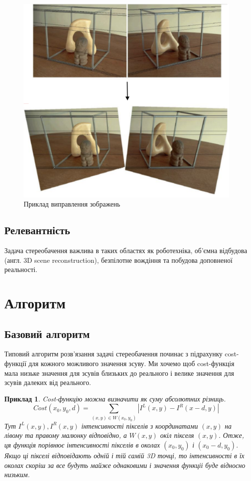 \documentclass[11pt]{article}
\newtheorem*{example*}{Приклад}
\theoremstyle{definition}
\begin{document}
\begin{figure}[h]
	\includegraphics[width=0.7\linewidth]{rectification_example}
	\centering
	\caption{Приклад виправлення зображень}
	\label{fig:rectification_example}
\end{figure}

\subsection{Релевантність}
Задача стереобачення важлива в таких областях як роботехніка, об'ємна відбудова (англ. 3D scene reconstruction), безпілотне вождіння та побудова доповненої реальності.

\section{Алгоритм}
\subsection{Базовий алгоритм}
Типовий алгоритм розв'язання задачі стереобачення починає з підрахунку cost-функції для кожного можливого значення зсуву. Ми хочемо щоб cost-функція мала низьке значення для зсувів близьких до реального і велике значення для зсувів далеких від реального. 
\begin{example*}
	Cost-функцію можна визначити як суму абсолютних різниць.
	\[ Cost(x_0, y_0, d) = \sum_{(x, y) \in W(x_0,y_0)} \left| I^L(x, y) - I^R(x - d, y) \right| \]
	Тут $I^L(x,y), I^R(x,y)$ інтенсивності пікселів з координатами $(x,y)$ на лівому та правому малюнку відповідно, а $W(x,y)$ окіл пікселя $(x,y)$. Отже, ця функція порівнює інтенсивності пікселів в околах $(x_0, y_0)$ і $(x_0 - d, y_0)$. Якщо ці пікселі відповідають одній і тій самій 3D точці, то інтенсивності в їх околах скоріш за все будуть майже однаковими і значення функціі буде відносно низьким.
\end{example*}
\end{document}
